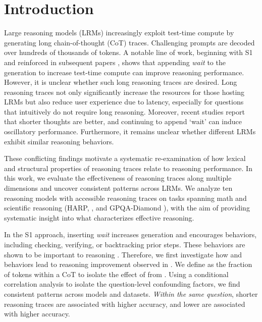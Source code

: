 \section{Introduction}
\label{section:intro}

Large reasoning models (LRMs) \citep{jaech2024openai, rastogi2025magistral} increasingly exploit test-time compute by generating long chain-of-thought (CoT) traces. Challenging prompts are decoded over hundreds of thousands of tokens. A notable line of work, beginning with S1 \citep{muennighoff2025s1} and reinforced in subsequent papers \citep{ringel2025learning, jurayj2025your}, shows that appending \textit{wait} to the generation to increase test-time compute can improve reasoning performance. However, it is unclear whether such long reasoning traces are desired. Long reasoning traces not only significantly increase the resources for those hosting LRMs but also reduce user experience due to latency, especially for questions that intuitively do not require long reasoning. Moreover, recent studies \citep{wu2025more, hassid2025don, ghosal2025does, marjanovic2025deepseek} report that shorter thoughts are better, and continuing to append `wait' can induce oscillatory performance. Furthermore, it remains unclear whether different LRMs exhibit similar reasoning behaviors. 

These conflicting findings motivate a systematic re-examination of how lexical and structural properties of reasoning traces relate to reasoning performance. In this work, we evaluate the effectiveness of reasoning traces along multiple dimensions and uncover consistent patterns across LRMs. We analyze ten reasoning models with accessible reasoning traces on tasks spanning math and scientific reasoning (HARP, \citet{yue2024harp}, and GPQA-Diamond \citep{rein2024gpqa}), with the aim of providing systematic insight into what characterizes effective reasoning. 

 In the S1 approach, inserting \textit{wait} increases generation \Length and encourages \Review behaviors, including checking, verifying, or backtracking prior steps. These \Review behaviors are shown to be important to reasoning \citep{gandhi2025cognitive, chen2024not}. Therefore, we first investigate how \Length and \Review behaviors lead to reasoning improvement observed in \citet{muennighoff2025s1}. We define \rr as the fraction of \Review tokens within a CoT to isolate the effect of \Review from \Length. Using a conditional correlation analysis to isolate the question-level confounding factors, we find consistent patterns across models and datasets. \textit{Within the same question}, shorter reasoning traces are associated with higher accuracy, and lower \rr are associated with higher accuracy. 



